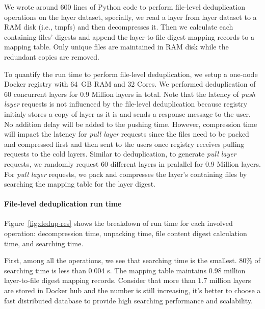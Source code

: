 We wrote around 600 lines of Python code to perform file-level deduplication
operations on the layer dataset, specially, we read a layer from layer dataset
to a RAM disk (i.e., tmpfs) and then decompresses it. 
%
Then we
calculate each containing files' digests and append the layer-to-file digest
mapping records to a mapping table. 
%
Only unique files are maintained in RAM
disk while the redundant copies are removed.

To quantify the run time to perform file-level deduplication, we setup a
one-node Docker registry with 64~GB RAM and 32 Cores.  
%
We performed
deduplication of 60 concurrent layers for 0.9 Million layers in total.
%
%
Note that the latency of \emph{push layer} requests is not influenced by the
file-level deduplication because registry initialy stores a copy of layer as it is
and sends a response message to the user. 
%
No addition delay will be added to the pushing time. 
%
However, compression time will impact the latency for \emph{pull layer} requests
since the files need to be packed and compressed first and then sent to the
users once registry receives pulling requests to the cold layers. 
%
Similar to deduplication, to generate \emph{pull layer}
requests, we randomly request 60 different layers in pralallel for 0.9 Million
layers. 
%
For \emph{pull layer} requests, we pack and compresses the layer's containing
files by searching the mapping table for the layer digest. 

\paragraph{File-level deduplication run time}

%
Figure~\ref{fig:dedup-res} shows the breakdown of run time for each
involved operation: decompression time, unpacking time, file content digest
calculation time, and searching time.

First, among all the operations, we see that searching time is the
smallest. 
%
80\% of searching time is less than 0.004 s. 
%
The mapping table
maintains 0.98 million layer-to-file digest mapping records. 
%
Consider that more
than 1.7 million layers are stored in Docker hub and the number is still
increasing, it's better to choose a fast distributed database to provide high
searching performance and scalability.
%
  
